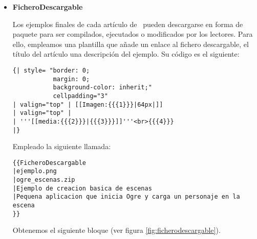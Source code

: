 \begin{itemize}
\begin{lstlisting}[style=wiki]
    [[{{CURRENTDAYNAME}}]]
    [[{{CURRENTDAY}} de {{CURRENTMONTHNAME}}|
    <span style= "font-size: x-large;
                  width: 100%;
                  display: block;
                  padding:6px 0px">
        {{CURRENTDAY}}
    </span>]]
    
    <span style="display: block;"> [[{{CURRENTMONTHNAME}}]]</span>
    
    <span style= "background: #aaa;
                  color: #000;
                  display: block;">
    '''[[{{CURRENTYEAR}}]]'''
    </span>
</div>
    \end{lstlisting}
    
    El resultado producido es el que podemos ver en la figura \ref{fig:calendario}.\\
    
    
    \item \textbf{FicheroDescargable}
    
    Los ejemplos finales de cada artículo de \wiki\ pueden descargarse
    en forma de paquete para ser compilados, ejecutados o modificados
    por los lectores. Para ello, empleamos una plantilla que añade
    un enlace al fichero descargable, el título del artículo una
    descripción del ejemplo. Su código es el siguiente:
    
    \begin{lstlisting}[style=wiki]
{| style= "border: 0;
           margin: 0;
           background-color: inherit;"
           cellpadding="3"
| valign="top" | [[Imagen:{{{1}}}|64px|]]
| valign="top" | 
| '''[[media:{{{2}}}|{{{3}}}]]'''<br>{{{4}}}
|}
    \end{lstlisting}
    
    Empleado la siguiente llamada:
    
        \begin{lstlisting}[style=wiki]
{{FicheroDescargable
|ejemplo.png
|ogre_escenas.zip
|Ejemplo de creacion basica de escenas
|Pequena aplicacion que inicia Ogre y carga un personaje en la escena
}} 
    \end{lstlisting}
    
    Obtenemos el siguiente bloque (ver figura \ref{fig:ficherodescargable}).\\
    
    
\end{itemize}

